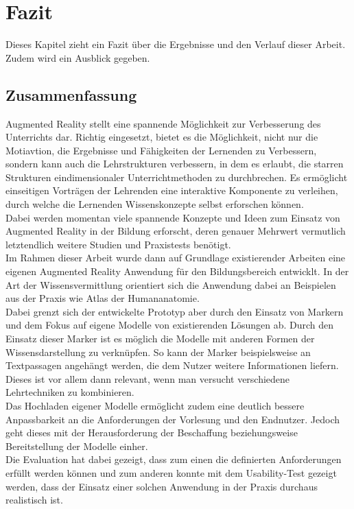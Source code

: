 \chapter{Fazit}\label{chapter:fazit}
Dieses Kapitel zieht ein Fazit über die Ergebnisse und den Verlauf dieser Arbeit. Zudem wird ein Ausblick gegeben.

\section{Zusammenfassung}\label{sec:zusammenfassung}
Augmented Reality stellt eine spannende Möglichkeit zur Verbesserung des Unterrichts dar. Richtig eingesetzt, bietet es die Möglichkeit, nicht nur die Motiavtion, die Ergebnisse und Fähigkeiten der Lernenden zu Verbessern, sondern kann auch die Lehrstrukturen verbessern, in dem es erlaubt, die starren Strukturen eindimensionaler Unterrichtmethoden zu durchbrechen. Es ermöglicht einseitigen Vorträgen der Lehrenden eine interaktive Komponente zu verleihen, durch welche die Lernenden Wissenskonzepte selbst erforschen können.\\
Dabei werden momentan viele spannende Konzepte und Ideen zum Einsatz von Augmented Reality in der Bildung erforscht, deren genauer Mehrwert vermutlich letztendlich weitere Studien und Praxistests benötigt. \\
Im Rahmen dieser Arbeit wurde dann auf Grundlage existierender Arbeiten eine eigenen Augmented Reality Anwendung für den Bildungsbereich entwicklt. In der Art der Wissensvermittlung orientiert sich die Anwendung dabei an Beispielen aus der Praxis wie \glqq Atlas der Humananatomie\grqq . \\
Dabei grenzt sich der entwickelte Prototyp aber durch den Einsatz von Markern und dem Fokus auf eigene Modelle von existierenden Lösungen ab. Durch den Einsatz dieser Marker ist es möglich die Modelle mit anderen Formen der Wissensdarstellung zu verknüpfen. So kann der Marker beispielsweise an Textpassagen angehängt werden, die dem Nutzer weitere Informationen liefern. Dieses ist vor allem dann relevant, wenn man versucht verschiedene Lehrtechniken zu kombinieren. \\
Das Hochladen eigener Modelle ermöglicht zudem eine deutlich bessere Anpassbarkeit an die Anforderungen der Vorlesung und den Endnutzer. Jedoch geht dieses mit der Herausforderung der Beschaffung beziehungsweise Bereitstellung der Modelle einher.\\
Die Evaluation hat dabei gezeigt, dass zum einen die definierten Anforderungen erfüllt werden können und zum anderen konnte mit dem Usability-Test gezeigt werden, dass der Einsatz einer solchen Anwendung in der Praxis durchaus realistisch ist. 

